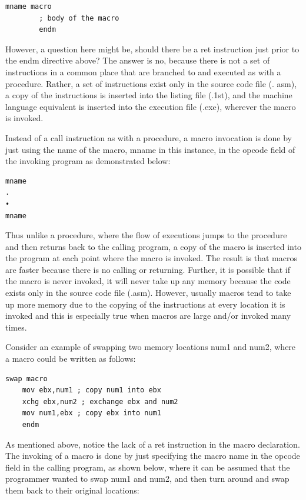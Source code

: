 \documentclass[10pt]{book}
\begin{document}
\begin{verbatim}
mname macro
        ; body of the macro
        endm
\end{verbatim}

However, a question here might be, should there be a ret instruction just prior to the endm directive above? The answer is no, because there is not a set of instructions in a common place that are branched to and executed as with a procedure. Rather, a set of instructions exist only in the source code file (. asm), a copy of the instructions is inserted into the listing file (.1st), and the machine language equivalent is inserted into the execution file (.exe), wherever the macro is invoked.

Instead of a call instruction as with a procedure, a macro invocation is done by just using the name of the macro, mname in this instance, in the opcode field of the invoking program as demonstrated below:


\begin{verbatim}
mname
.
•
mname
\end{verbatim}

Thus unlike a procedure, where the flow of executions jumps to the procedure and then returns back to the calling program, a copy of the macro is inserted into the program at each point where the macro is invoked. The result is that macros are faster because there is no calling or returning. Further, it is possible that if the macro is never invoked, it will never take up any memory because the code exists only in the source code file (.asm). However, usually macros tend to take up more memory due to the copying of the instructions at every location it is invoked and this is especially true when macros are large and/or invoked many times.

Consider an example of swapping two memory locations num1 and num2, where a macro could be written as follows:

\begin{verbatim}
swap macro
    mov ebx,num1 ; copy num1 into ebx
    xchg ebx,num2 ; exchange ebx and num2
    mov num1,ebx ; copy ebx into num1
    endm
\end{verbatim}

As mentioned above, notice the lack of a ret instruction in the macro declaration. The invoking of a macro is done by just specifying the macro name in the opcode field in the calling program, as shown below, where it can be assumed that the programmer wanted to swap num1 and num2, and then turn around and swap them back to their original locations:
\end{document}
